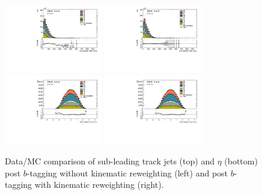 \begin{figure}[htbp]
  \centering
\includegraphics[width=0.38\textwidth]{figures/gbb/SubLeadTrkJet_pT_PreReweight.pdf}
 \includegraphics[width=0.38\textwidth]{figures/gbb/SubLeadTrkJet_pT_Reweight.pdf}
\includegraphics[width=0.38\textwidth]{figures/gbb/SubLeadTrkJet_eta_PreReweight.pdf}
 \includegraphics[width=0.38\textwidth]{figures/gbb/SubLeadTrkJet_eta_Reweight.pdf}
\caption{Data/MC comparison of sub-leading track jets \pt (top) and $\eta$ (bottom) post $b$-tagging without kinematic reweighting (left) and post $b$-tagging with kinematic reweighting (right).}%
  \label{fig:gbb-pT_subtrkjets}
\end{figure}



